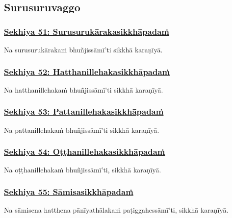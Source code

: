 \subsection{Surusuruvaggo}

\subsubsection*{\hyperref[training51]{Sekhiya 51: Surusurukārakasikkhāpadaṁ}}
\label{sekh51}

Na surusurukārakaṁ bhuñjissāmī'ti sikkhā karaṇīyā.



\subsubsection*{\hyperref[training52]{Sekhiya 52: Hatthanillehakasikkhāpadaṁ}}
\label{sekh52}

Na hatthanillehakaṁ bhuñjissāmī'ti sikkhā karaṇīyā.



\subsubsection*{\hyperref[training53]{Sekhiya 53: Pattanillehakasikkhāpadaṁ}}
\label{sekh53}

Na pattanillehakaṁ bhuñjissāmī'ti sikkhā karaṇīyā.



\subsubsection*{\hyperref[training54]{Sekhiya 54: Oṭṭhanillehakasikkhāpadaṁ}}
\label{sekh54}

Na oṭṭhanillehakaṁ bhuñjissāmī'ti, sikkhā karaṇīyā.



\subsubsection*{\hyperref[training55]{Sekhiya 55: Sāmisasikkhāpadaṁ}}
\label{sekh55}

Na sāmisena hatthena pānīyathālakaṁ paṭiggahessāmī'ti, sikkhā karaṇīyā.



